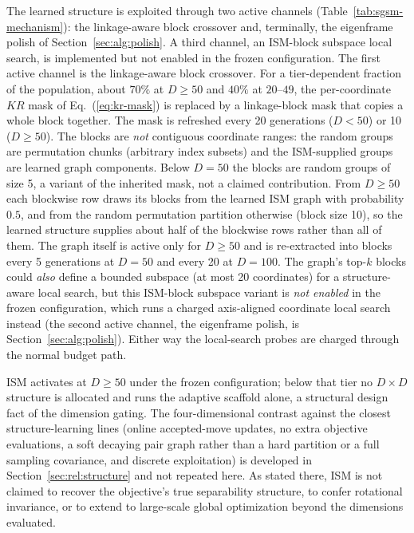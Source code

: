 The learned structure is exploited through two active channels
(Table~\ref{tab:sgsm-mechanism}): the linkage-aware block crossover and,
terminally, the eigenframe polish of Section~\ref{sec:alg:polish}. A third
channel, an ISM-block subspace local search, is implemented but not
enabled in the frozen configuration.
The first active channel is the linkage-aware block crossover. For a
tier-dependent fraction of the population, about $70\%$ at $D\ge50$ and
$40\%$ at $20$--$49$, the per-coordinate $KR$ mask of
Eq.~(\ref{eq:kr-mask}) is replaced by a linkage-block mask that copies a
whole block together. The mask is
refreshed every 20 generations ($D{<}50$) or 10 ($D\ge50$). %
The blocks are \emph{not} contiguous coordinate ranges: the random groups
are permutation chunks (arbitrary index subsets) and the ISM-supplied groups
are learned graph components.
Below $D=50$ the blocks are random groups of size 5, a
variant of the inherited mask, not a claimed contribution. From
$D\ge50$ each blockwise row draws its blocks from the learned ISM graph
with probability $0.5$, and from the random permutation partition
otherwise (block size 10), so the learned structure supplies about half
of the blockwise rows rather than all of them.
The graph itself is active only for $D\ge50$ and is re-extracted into
blocks every 5 generations at $D=50$ and every 20 at $D=100$. %
The graph's top-$k$ blocks could \emph{also} define a bounded subspace (at
most 20 coordinates) for a structure-aware local search, but this ISM-block
subspace variant is \emph{not enabled} in the frozen configuration, which
runs a charged axis-aligned coordinate local search instead (the second
active channel, the eigenframe polish, is Section~\ref{sec:alg:polish}). Either
way the local-search probes are charged through the normal budget path. %

ISM activates at $D\ge50$ under the frozen configuration; below that
tier no $D\times D$ structure is allocated and \dtgsk{} runs the
adaptive scaffold alone, a structural design fact of the
dimension gating. %
The four-dimensional contrast against the closest structure-learning
lines (online accepted-move updates, no extra objective evaluations,
a soft decaying pair graph rather than a hard partition or a full
sampling covariance, and discrete exploitation) is developed in
Section~\ref{sec:rel:structure} and not repeated here.
As stated there, ISM is not claimed to recover the objective's true
separability structure, to confer rotational invariance, or to extend
to large-scale global optimization beyond the dimensions evaluated.


